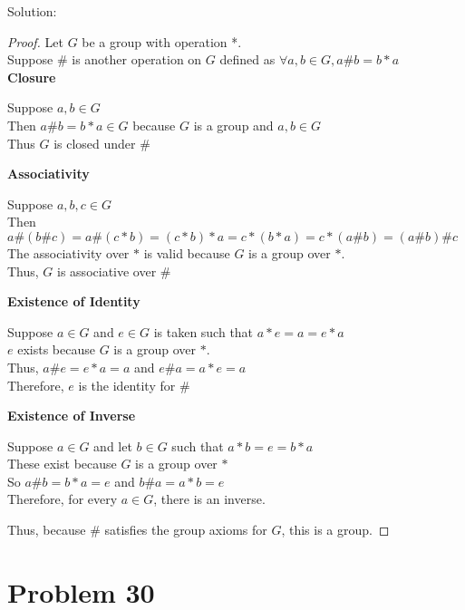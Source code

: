 \documentclass{article} %
\begin{document}
Solution: 
\begin{addmargin}[1em]{0em}
\begin{proof}
Let $G$ be a group with operation *.
\\Suppose $\#$ is another operation on $G$ defined as $\forall a,b \in G, a \# b = b * a$
\\ \textbf{Closure}
\begin{addmargin}[1em]{0em}
Suppose $a, b \in G$
\\Then $a \# b = b * a \in G$ because $G$ is a group and $a, b \in G$
\\Thus $G$ is closed under $\#$
\end{addmargin}
\textbf{Associativity}
\begin{addmargin}[1em]{0em}
Suppose $a, b, c \in G$
\\Then $a \# (b \# c) = a \# (c * b) = (c * b) * a = c * (b * a) = c * (a \# b) = (a \# b) \# c$
\\The associativity over $*$ is valid because $G$ is a group over $*$.
\\Thus, $G$ is associative over $\#$
\end{addmargin}
\textbf{Existence of Identity}
\begin{addmargin}[1em]{0em}
Suppose $a \in G$ and $e \in G$ is taken such that $a*e = a = e*a$
\\$e$ exists because $G$ is a group over $*$.
\\Thus, $a \# e = e*a = a$ and $e \# a = a*e = a$
\\Therefore, $e$ is the identity for $\#$
\end{addmargin}
\textbf{Existence of Inverse}
\begin{addmargin}[1em]{0em}
Suppose $a \in G$ and let $b \in G$ such that $a * b = e = b * a$
\\These exist because $G$ is a group over $*$
\\So $a \# b = b*a = e$ and $b \# a = a * b = e$
\\Therefore, for every $a \in G$, there is an inverse.
\end{addmargin}
Thus, because $\#$ satisfies the group axioms for $G$, this is a group.
\end{proof}
\end{addmargin}

\newpage

\section*{Problem 30}
\end{document}
